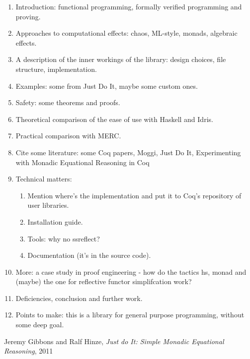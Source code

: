 \documentclass[declaration,inz,english,shortabstract]{iithesis}
\begin{document}
\begin{enumerate}
    \item Introduction: functional programming, formally verified programming and proving.
    \item Approaches to computational effects: chaos, ML-style, monads, algebraic effects.
    \item A description of the inner workings of the library: design choices, file structure, implementation.
    \item Examples: some from Just Do It, maybe some custom ones.
    \item Safety: some theorems and proofs.
    \item Theoretical comparison of the ease of use with Haskell and Idris.
    \item Practical comparison with MERC.
    \item Cite some literature: some Coq papers, Moggi, Just Do It, Experimenting with Monadic Equational Reasoning in Coq
    \item Technical matters:
    \begin{enumerate}
        \item Mention where's the implementation and put it to Coq's repository of user libraries.
        \item Installation guide.
        \item Tools: why no ssreflect?
        \item Documentation (it's in the source code).
    \end{enumerate}
    \item More: a case study in proof engineering - how do the tactics hs, monad and (maybe) the one for reflective functor simplifcation work?
    \item Deficiencies, conclusion and further work.
    \item Points to make: this is a library for general purpose programming, without some deep goal.
\end{enumerate}


\begin{thebibliography}{1}

      Jeremy Gibbons and Ralf Hinze,
      \textit{Just do It: Simple Monadic Equational Reasoning},
      2011
    
\end{thebibliography}

\end{document}

